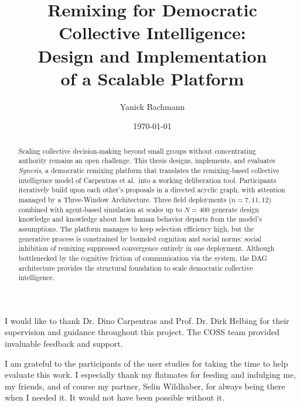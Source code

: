 \documentclass[a4paper, 12pt, twoside]{iviathesis}
\title{Remixing for Democratic\texorpdfstring{\\}{ }Collective Intelligence:\texorpdfstring{\\[0.2em]}{ }Design and Implementation\texorpdfstring{\\}{ }of a Scalable Platform}
\author{Yanick Bachmann}
\institute{Chair: Computational Social Science\\[2pt] 
ETH Zürich\\[1em] 
\textbf{Proposed Supervisors:} \ Prof. Dr. Dirk Helbing, Dr. Dino Carpentras}
\date{\today}
\begin{document}
\onehalfspacing

\frontmatter %
\maketitle 
\cleardoublepage

\begin{abstract} 
Scaling collective decision-making beyond small groups without concentrating authority remains an open challenge. This thesis designs, implements, and evaluates \textit{Synesis}, a democratic remixing platform that translates the remixing-based collective intelligence model of Carpentras et al.\ into a working deliberation tool. Participants iteratively build upon each other's proposals in a directed acyclic graph, with attention managed by a Three-Window Architecture. Three field deployments ($n = 7, 11, 12$) combined with agent-based simulation at scales up to $N = 400$ generate design knowledge and knowledge about how human behavior departs from the model's assumptions. The platform manages to keep selection efficiency high, but the generative process is constrained by bounded cognition and social norms: social inhibition of remixing suppressed convergence entirely in one deployment. Although bottlenecked by the cognitive friction of communication via the system, the DAG architecture provides the structural foundation to scale democratic collective intelligence.
\end{abstract}

\begin{acknowledgements}
I would like to thank Dr. Dino Carpentras and Prof. Dr. Dirk Helbing for their supervision and guidance throughout this project. The COSS team provided invaluable feedback and support.

I am grateful to the participants of the user studies for taking the time to help evaluate this work. I especially thank my flatmates for feeding and indulging me, my friends, and of course my partner, Selin Wildhaber, for always being there when I needed it. It would not have been possible without it.
\end{acknowledgements}
\end{document}
